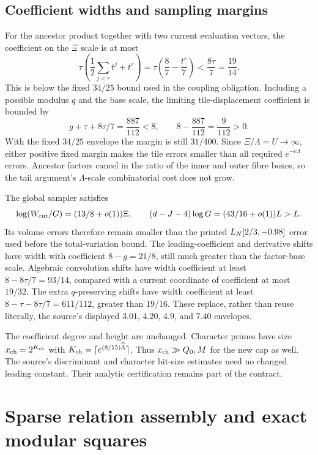 \subsection{Coefficient widths and sampling margins}

For the ancestor product together with two current evaluation
vectors, the coefficient on the $\Xi$ scale is at most
\[
 \tau\left(\frac12\sum_{j<r}t^j+t^r\right)
 =\tau\left(\frac87-\frac{t^r}{7}\right)
 <\frac{8\tau}{7}=\frac{19}{14}.
\]
This is below the fixed $34/25$ bound used in the coupling
obligation.  Including a possible modulus $q$ and the base scale,
the limiting tile-displacement coefficient is bounded by
\begin{equation}
 g+\tau+8\tau/7=\frac{887}{112}<8,
 \qquad 8-\frac{887}{112}=\frac9{112}>0.
 \label{rf:tilegap}
\end{equation}
With the fixed $34/25$ envelope the margin is still $31/400$.
Since $\Xi/\Lambda=U\longrightarrow\infty$, either positive
fixed margin makes the tile errors smaller than all required
$e^{-c\Lambda}$ errors.  Ancestor factors cancel in the ratio of
the inner and outer fibre boxes, so the tail argument's
$\Lambda$-scale combinatorial cost does not grow.

The global sampler satisfies
\[
 \log(W_{\rm cut}/G)=(13/8+o(1))\Xi,
 \qquad(d-J-4)\log G=(43/16+o(1))L>L.
\]
Its volume errors therefore remain smaller than the printed
$L_N[2/3,-0.98]$ error used before the total-variation bound.
The leading-coefficient and derivative shifts have width with
coefficient $8-g=21/8$, still much greater than the factor-base
scale.  Algebraic convolution shifts have width coefficient at
least $8-8\tau/7=93/14$, compared with a current coordinate of
coefficient at most $19/32$.  The extra $q$-preserving shifts
have width coefficient at least $8-\tau-8\tau/7=611/112$,
greater than $19/16$.  These replace, rather than reuse literally,
the source's displayed $3.01$, $4.20$, $4.9$, and $7.40$ envelopes.

The coefficient degree and height are unchanged.  Character primes
have size $x_{\rm ch}=2^{K_{\rm ch}}$ with
$K_{\rm ch}=\lceil e^{(8/15)\widehat\Lambda}\rceil$.
Thus $x_{\rm ch}\gg Q_0,M$ for the new cap as well.
The source's discriminant and character bit-size estimates need
no changed leading constant.  Their analytic certification remains
part of the contract.

\section{Sparse relation assembly and exact modular squares}
\label{rf:relations}

